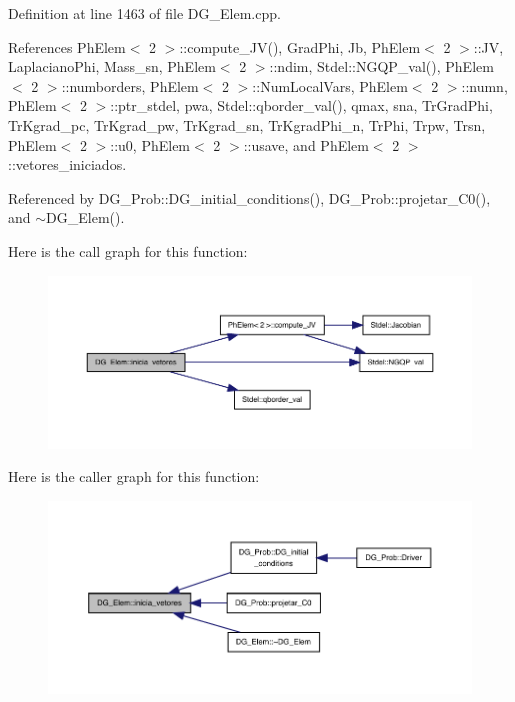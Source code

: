 Definition at line 1463 of file D\+G\+\_\+\+Elem.\+cpp.



References Ph\+Elem$<$ 2 $>$\+::compute\+\_\+\+J\+V(), Grad\+Phi, Jb, Ph\+Elem$<$ 2 $>$\+::\+JV, Laplaciano\+Phi, Mass\+\_\+sn, Ph\+Elem$<$ 2 $>$\+::ndim, Stdel\+::\+N\+G\+Q\+P\+\_\+val(), Ph\+Elem$<$ 2 $>$\+::numborders, Ph\+Elem$<$ 2 $>$\+::\+Num\+Local\+Vars, Ph\+Elem$<$ 2 $>$\+::numn, Ph\+Elem$<$ 2 $>$\+::ptr\+\_\+stdel, pwa, Stdel\+::qborder\+\_\+val(), qmax, sna, Tr\+Grad\+Phi, Tr\+Kgrad\+\_\+pc, Tr\+Kgrad\+\_\+pw, Tr\+Kgrad\+\_\+sn, Tr\+Kgrad\+Phi\+\_\+n, Tr\+Phi, Trpw, Trsn, Ph\+Elem$<$ 2 $>$\+::u0, Ph\+Elem$<$ 2 $>$\+::usave, and Ph\+Elem$<$ 2 $>$\+::vetores\+\_\+iniciados.



Referenced by D\+G\+\_\+\+Prob\+::\+D\+G\+\_\+initial\+\_\+conditions(), D\+G\+\_\+\+Prob\+::projetar\+\_\+\+C0(), and $\sim$\+D\+G\+\_\+\+Elem().

Here is the call graph for this function\+:
\nopagebreak
\begin{figure}[H]
\begin{center}
\leavevmode
\includegraphics[width=350pt]{classDG__Elem_ac1ec1f962d6e1852f0adb01048c4c1f9_cgraph}
\end{center}
\end{figure}
Here is the caller graph for this function\+:
\nopagebreak
\begin{figure}[H]
\begin{center}
\leavevmode
\includegraphics[width=350pt]{classDG__Elem_ac1ec1f962d6e1852f0adb01048c4c1f9_icgraph}
\end{center}
\end{figure}
\mbox{\label{classPhElem_a3064c3377eb3f81d63f43969a3c958ee}} 
